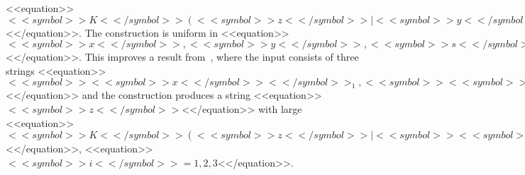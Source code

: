 \documentclass[proceedings]{stacs}
\begin{document}
\begin{itemize}
<<equation>>$<<symbol>>K<</symbol>>(<<symbol>>z<</symbol>> \mid <<symbol>>y<</symbol>>) \succeq <<symbol>>m<</symbol>> - <<symbol>>\alpha<</symbol>>(<<symbol>>n<</symbol>>)$<</equation>>. The construction is uniform in <<equation>>$<<symbol>>x<</symbol>>,<<symbol>>y<</symbol>>, <<symbol>>s<</symbol>>(<<symbol>>n<</symbol>>), <<symbol>>\alpha<</symbol>>(<<symbol>>n<</symbol>>)$<</equation>>. This improves a result from~\cite{cal-zim:c:dlt08}, where the input consists of three strings <<equation>>$<<symbol>><<symbol>>x<</symbol>><</symbol>>_1, <<symbol>><<symbol>>x<</symbol>><</symbol>>_2, <<symbol>><<symbol>>x<</symbol>><</symbol>>_3$<</equation>> and the construction produces a string <<equation>>$<<symbol>>z<</symbol>>$<</equation>> with large <<equation>>$<<symbol>>K<</symbol>>(<<symbol>>z<</symbol>> \mid <<symbol>><<symbol>>x<</symbol>>_<<symbol>>i<</symbol>><</symbol>>)$<</equation>>, <<equation>>$<<symbol>>i<</symbol>>=1,2,3$<</equation>>.
\end{itemize}
\end{document}
